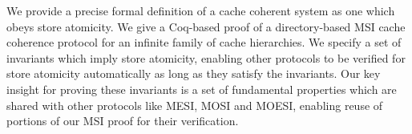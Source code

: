 We provide a precise formal definition of a cache coherent system as one
which obeys store atomicity. We give a Coq-based proof of a directory-based MSI cache
coherence protocol for an infinite family of cache hierarchies. We specify a
set of invariants which imply store atomicity, enabling other protocols to be
verified for store atomicity automatically as long as they satisfy the
invariants. Our key insight for proving these invariants is a set of
fundamental properties which are shared with other protocols like MESI, MOSI
and MOESI, enabling reuse of portions of our MSI proof for their verification.


